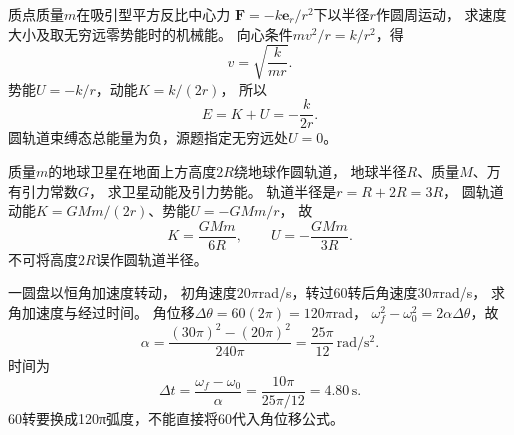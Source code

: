 \problemtext 质点质量$m$在吸引型平方反比中心力
$\bm F=-k\bm e_r/r^2$下以半径$r$作圆周运动，
求速度大小及取无穷远零势能时的机械能。
\workings
向心条件$mv^2/r=k/r^2$，得
\[
\boxed{v=\sqrt{\frac{k}{mr}}}.
\]
势能$U=-k/r$，动能$K=k/(2r)$，
所以
\[
\boxed{E=K+U=-\frac{k}{2r}}.
\]
\crosscheck 圆轨道束缚态总能量为负，源题指定无穷远处$U=0$。

\problemtext 质量$m$的地球卫星在地面上方高度$2R$绕地球作圆轨道，
地球半径$R$、质量$M$、万有引力常数$G$，
求卫星动能及引力势能。
\workings
轨道半径是$r=R+2R=3R$，
圆轨道动能$K=GMm/(2r)$、势能$U=-GMm/r$，
故
\[
\boxed{K=\frac{GMm}{6R}},\qquad
\boxed{U=-\frac{GMm}{3R}}.
\]
\crosscheck 不可将高度$2R$误作圆轨道半径。

\problemtext 一圆盘以恒角加速度转动，
初角速度$20\pi$rad/s，转过60转后角速度$30\pi$rad/s，
求角加速度与经过时间。
\workings
角位移$\Delta\theta=60(2\pi)=120\pi$rad，
$\omega_f^2-\omega_0^2=2\alpha\Delta\theta$，故
\[
\boxed{\alpha=\frac{(30\pi)^2-(20\pi)^2}{240\pi}
=\frac{25\pi}{12}\,\mathrm{rad/s^2}}.
\]
时间为
\[
\boxed{\Delta t=\frac{\omega_f-\omega_0}{\alpha}
=\frac{10\pi}{25\pi/12}=4.80\,\mathrm s}.
\]
\crosscheck 60转要换成120π弧度，不能直接将60代入角位移公式。
